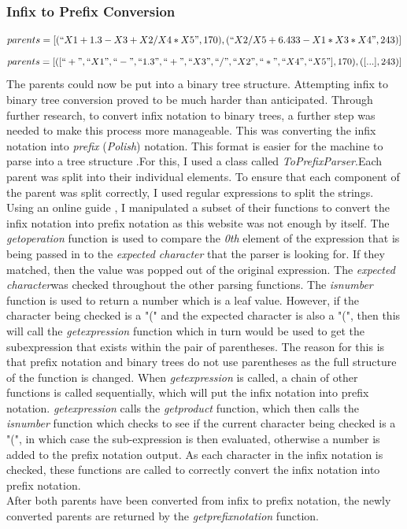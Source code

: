\documentclass[11pt]{article}
\begin{document}
\subsubsection{Infix to Prefix Conversion}
\begin{equation}parents = [(``X1+1.3-X3+X2/X4*X5",170),( ``X2/X5+6.433-X1*X3*X4",243)] \end{equation} \begin{equation}parents = [([``+", ``X1", ``-", ``1.3", ``+", ``X3", ``/", ``X2", ``*", ``X4", ``X5"], 170),([...],243)] \end{equation}
The parents could now be put into a binary tree structure. Attempting infix to binary tree conversion proved to be much harder than anticipated. Through further research, to convert infix notation to binary trees, a further step was needed to make this process more manageable. This was converting the infix notation into \textit{prefix} (\textit{Polish}) notation. This format is easier for the machine to parse into a tree structure .For this, I used a class called \textit{ToPrefixParser}.Each parent was split into their individual elements. To ensure that each component of the parent was split correctly, I used regular expressions to split the strings.
Using an online guide \cite{?}, I manipulated a subset of their functions to convert the infix notation into prefix notation as this website was not enough by itself. The \textit{get\textunderscore operation}  function is used to compare the \textit{0th} element of the expression that is being passed in to the \textit{expected character} that the parser is looking for. If they matched, then the value was popped out of the original expression. The \textit{expected character}was checked throughout the other parsing functions. The \textit{is\textunderscore number} function is used to return a number which is a leaf value. 
However, if the character being checked is a "(" and the expected character is also a "(", then this will call the \textit{get\textunderscore expression} function which in turn would be used to get the subexpression that exists within the pair of parentheses. The reason for this is that prefix notation and binary trees do not use parentheses as the full structure of the function is changed. When \textit{get\textunderscore expression} is called,  a chain of other functions is called sequentially, which will put the infix notation into prefix notation.
\textit{get\textunderscore expression} calls the \textit{get\textunderscore product} function, which then calls the \textit{is\textunderscore number} function which checks to see if the current character being checked is a "(", in which case the sub-expression is then evaluated, otherwise a number is added to the prefix notation output.  As each character in the infix notation is checked, these functions are called to correctly convert the infix notation into prefix notation. \\ 
After both parents have been converted from infix to prefix notation, the newly converted parents are returned by the \textit{get\textunderscore prefix\textunderscore notation} function.  
\end{document}
